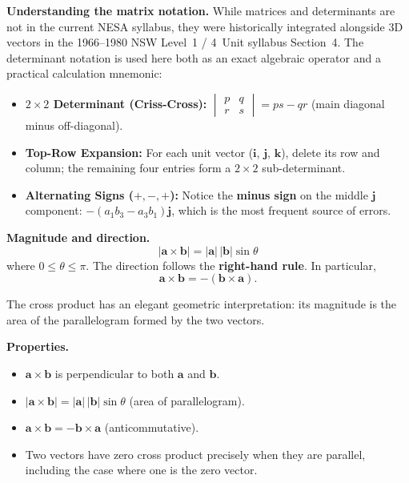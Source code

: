 \noindent\textbf{Understanding the matrix notation.}
While matrices and determinants are not in the current NESA syllabus, they were historically integrated alongside 3D vectors in the 1966--1980 NSW Level~1 / 4~Unit syllabus Section~4. The determinant notation is used here both as an exact algebraic operator and a practical calculation mnemonic:
\begin{itemize}[leftmargin=*,itemsep=1pt,topsep=2pt]
  \item \textbf{$2\times 2$ Determinant (Criss-Cross):}
    $\begin{vmatrix} p & q \\ r & s \end{vmatrix} = ps - qr$
    (main diagonal minus off-diagonal).
  \item \textbf{Top-Row Expansion:} For each unit vector
    ($\mathbf{i}$, $\mathbf{j}$, $\mathbf{k}$), delete its row and
    column; the remaining four entries form a $2\times 2$
    sub-determinant.
  \item \textbf{Alternating Signs ($+, -, +$):} Notice the
    \textbf{minus sign} on the middle $\mathbf{j}$ component:
    $-(a_1 b_3 - a_3 b_1)\mathbf{j}$, which is the most frequent
    source of errors.
\end{itemize}

\vspace{0.4em}
\noindent\textbf{Magnitude and direction.}
\[
  \boxed{
  |\mathbf{a} \times \mathbf{b}|
  = |\mathbf{a}|\,|\mathbf{b}|\sin\theta
  }
\]
where $0 \le \theta \le \pi$.
The direction follows the \textbf{right-hand rule}.
In particular,
\[
  \mathbf{a} \times \mathbf{b}
  = -(\mathbf{b} \times \mathbf{a}).
\]

The cross product has an elegant geometric interpretation: its
magnitude is the area of the parallelogram formed by the two vectors.

\vspace{0.4em}
\noindent\textbf{Properties.}
\begin{itemize}[leftmargin=*,itemsep=1pt,topsep=2pt]
  \item $\mathbf{a} \times \mathbf{b}$ is perpendicular to both
        $\mathbf{a}$ and $\mathbf{b}$.
  \item $|\mathbf{a} \times \mathbf{b}|
        = |\mathbf{a}|\,|\mathbf{b}|\sin\theta$
        (area of parallelogram).
  \item $\mathbf{a} \times \mathbf{b}
        = -\mathbf{b} \times \mathbf{a}$ (anticommutative).
  \item Two vectors have zero cross product precisely when they are
        parallel, including the case where one is the zero vector.
\end{itemize}

